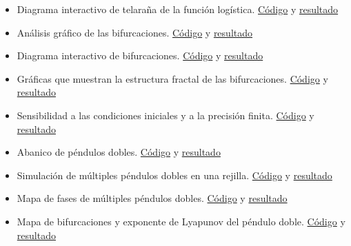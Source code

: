 \documentclass[
  10pt,
  a4paper,
  DIV=11,
  numbers=noendperiod,
  open=any]{scrreprt}
\numberwithin{equation}{chapter}
\numberwithin{equation}{section}
\renewcommand{\[}{\begin{equation}}
\renewcommand{\]}{\end{equation}}
\begin{document}
\begin{itemize}
\item
  Diagrama interactivo de telaraña de la función logística.
  \href{https://github.com/ColaCaos/ColaCAOS/blob/master/quarto/caos-libro/01-logistica/cobweb.qmd}{Código}
  y
  \href{https://colacaos.github.io/ColaCAOS/01-logistica/cobweb.html}{resultado}
\item
  Análisis gráfico de las bifurcaciones.
  \href{https://github.com/ColaCaos/ColaCAOS/blob/master/quarto/caos-libro/01-logistica/bifurcaciones.qmd}{Código}
  y
  \href{https://colacaos.github.io/ColaCAOS/01-logistica/bifurcaciones.html}{resultado}
\item
  Diagrama interactivo de bifurcaciones.
  \href{https://github.com/ColaCaos/ColaCAOS/blob/master/quarto/caos-libro/01-logistica/simulacion.qmd}{Código}
  y
  \href{https://colacaos.github.io/ColaCAOS/01-logistica/simulacion.html}{resultado}
\item
  Gráficas que muestran la estructura fractal de las bifurcaciones.
  \href{https://github.com/ColaCaos/ColaCAOS/blob/master/quarto/caos-libro/01-logistica/Caos.qmd}{Código}
  y
  \href{https://colacaos.github.io/ColaCAOS/01-logistica/Caos.html}{resultado}
\item
  Sensibilidad a las condiciones iniciales y a la precisión finita.
  \href{https://github.com/ColaCaos/ColaCAOS/blob/master/quarto/caos-libro/01-logistica/lyapunov.qmd}{Código}
  y
  \href{https://colacaos.github.io/ColaCAOS/01-logistica/lyapunov.html}{resultado}
\item
  Abanico de péndulos dobles.
  \href{https://github.com/ColaCaos/ColaCAOS/blob/master/pendulumFan.py}{Código}
  y
  \href{https://colacaos.github.io/ColaCAOS/02-pendulo-doble/Pendulumabanico.mp4}{resultado}
\item
  Simulación de múltiples péndulos dobles en una rejilla.
  \href{https://github.com/ColaCaos/ColaCAOS/blob/master/pendulumBoxes.py}{Código}
  y
  \href{https://colacaos.github.io/ColaCAOS/02-pendulo-doble/PendulumCajas.mp4}{resultado}
\item
  Mapa de fases de múltiples péndulos dobles.
  \href{https://github.com/ColaCaos/ColaCAOS/blob/master/pendulum720Animation.py}{Código}
  y
  \href{https://colacaos.github.io/ColaCAOS/02-pendulo-doble/MapaFase.mp4}{resultado}
\item
  Mapa de bifurcaciones y exponente de Lyapunov del péndulo doble.
  \href{https://github.com/ColaCaos/ColaCAOS/blob/master/PendulumLyapunov.py}{Código}
  y
  \href{https://colacaos.github.io/ColaCAOS/02-pendulo-doble/doble.html}{resultado}

\end{itemize}
\end{document}
